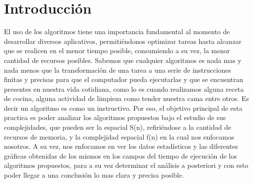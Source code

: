 \documentclass[12pt,twoside]{article}
\begin{document}
\section{Introducci\'on}
El uso de los algoritmos tiene una importancia fundamental al momento de desarrollar diversos aplicativos, permitiéndonos optimizar tareas hasta alcanzar que se realicen en el menor tiempo posible, consumiendo a su vez, la menor cantidad de recursos posibles.
Sabemos que cualquier algoritmos es nada mas y nada menos que la transformación de una tarea a una serie de instrucciones finitas y  precisas para que el computador pueda ejecutarlas y que se encuentran presentes en nuestra vida cotidiana, como lo es cuando realizamos alguna receta de cocina, alguna actividad de limpieza como tender nuestra cama entre otros.
Es decir un algoritmo es como un instructivo.
 Por eso, el objetivo principal de esta practica es poder analizar los algoritmos propuestos bajo el estudio de sus complejidades, que pueden ser la espacial S(n), refiriéndose a la cantidad de recursos de memoria, y la complejidad espacial f(n) en la cual nos enfocamos nosotros.
 A su vez, nos enfocamos en ver los datos estadísticos y las diferentes gráficas obtenidas de los mismos en los campos del tiempo de ejecución de los algoritmos propuestos, para a su vez determinar el análisis a posteriori y con esto poder llegar a una conclusión lo mas clara y precisa posible. 

\newpage
\end{document}
